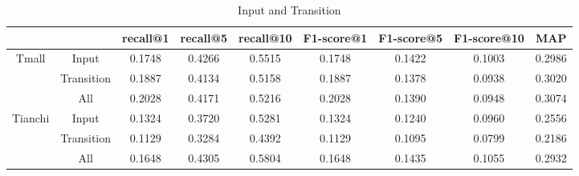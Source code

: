 \documentclass[conference]{IEEEtran}
\begin{document}
\begin{table}[htbp]
\centering\scriptsize
\caption{Input and Transition}
\begin{tabular}{ccccccccc}
    \toprule
          &  & recall@1 & recall@5 & recall@10 & F1-score@1 & F1-score@5 & F1-score@10 & MAP   \\
    \midrule
    \multirow{3}[0]{*}{Tmall} 
        &Input   &0.1748 &0.4266 & 0.5515  &0.1748  &0.1422  &0.1003  &0.2986   \\
        &Transition  &0.1887 & 0.4134  &0.5158&  0.1887& 0.1378  &0.0938&  0.3020   \\
        &All &0.2028  &0.4171  &0.5216  &0.2028  &0.1390  &0.0948 & 0.3074\\
    \midrule
    \multirow{3}[0]{*}{Tianchi} 
        &Input   &0.1324  &0.3720  &0.5281  &0.1324  &0.1240 & 0.0960  &0.2556   \\
        &Transition  &0.1129  &0.3284  &0.4392  &0.1129  &0.1095  &0.0799  &0.2186   \\
        &All &0.1648  &0.4305  &0.5804  &0.1648 & 0.1435&  0.1055  &0.2932\\
    \bottomrule
\end{tabular}%
\label{tab:InputAndTransition}%
\end{table}%
\end{document}
